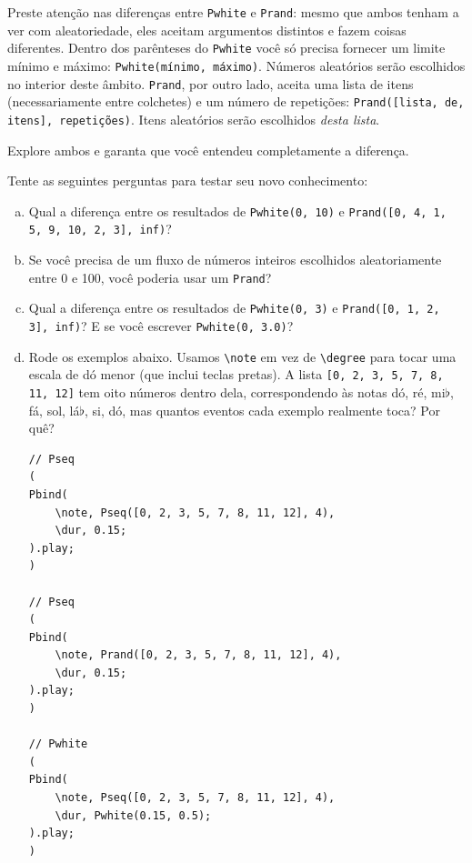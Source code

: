 Preste atenção nas diferenças entre \texttt{Pwhite} e \texttt{Prand}: mesmo que ambos tenham a ver com aleatoriedade, eles aceitam argumentos distintos e fazem coisas diferentes. Dentro dos parênteses do \texttt{Pwhite} você só precisa fornecer um limite mínimo e máximo: \texttt{Pwhite(mínimo, máximo)}. Números aleatórios serão escolhidos no interior deste âmbito. \texttt{Prand}, por outro lado, aceita uma lista de itens (necessariamente entre colchetes) e um número de repetições: \texttt{Prand([lista, de, itens], repetições)}. Itens aleatórios serão escolhidos \emph{desta lista}.

Explore ambos e garanta que você entendeu completamente a diferença.


\bigskip
{}
\bigskip
 


Tente as seguintes perguntas para testar seu novo conhecimento:

\begin{enumerate}[a)]
\item Qual a diferença entre os resultados de \texttt{Pwhite(0, 10)} e \texttt{Prand([0, 4, 1, 5, 9, 10, 2, 3], inf)}?

\item Se você precisa de um fluxo de números inteiros escolhidos aleatoriamente entre 0 e 100, você poderia usar um \texttt{Prand}?

\item Qual a diferença entre os resultados de \texttt{Pwhite(0, 3)} e \texttt{Prand([0, 1, 2, 3], inf)}? E se você escrever \texttt{Pwhite(0, 3.0)}?

\item  Rode os exemplos abaixo. Usamos \texttt{\textbackslash note} em vez de \texttt{\textbackslash degree} para tocar uma escala de dó menor (que inclui teclas pretas). A lista \texttt{[0, 2, 3, 5, 7, 8, 11, 12]} tem oito números dentro dela, correspondendo às notas dó, ré, mi$\flat$, fá, sol, lá$\flat$, si, dó, mas quantos eventos cada exemplo realmente toca? Por quê?

 
\begin{lstlisting}[style=SuperCollider-IDE, basicstyle=\scttfamily\footnotesize]
// Pseq
(
Pbind(
	\note, Pseq([0, 2, 3, 5, 7, 8, 11, 12], 4),
	\dur, 0.15;
).play;
)

// Pseq
(
Pbind(
	\note, Prand([0, 2, 3, 5, 7, 8, 11, 12], 4),
	\dur, 0.15;
).play;
)

// Pwhite
(
Pbind(
	\note, Pseq([0, 2, 3, 5, 7, 8, 11, 12], 4),
	\dur, Pwhite(0.15, 0.5);
).play;
)
\end{lstlisting}

\end{enumerate}


